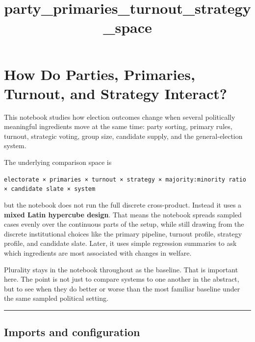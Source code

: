 \documentclass[11pt]{article}
\title{party\_primaries\_turnout\_strategy\_space}
\begin{document}
    
    \maketitle
    
    

    
    \section{How Do Parties, Primaries, Turnout, and Strategy
Interact?}\label{how-do-parties-primaries-turnout-and-strategy-interact}

This notebook studies how election outcomes change when several
politically meaningful ingredients move at the same time: party sorting,
primary rules, turnout, strategic voting, group size, candidate supply,
and the general-election system.

The underlying comparison space is

\texttt{electorate\ ×\ primaries\ ×\ turnout\ ×\ strategy\ ×\ majority:minority\ ratio\ ×\ candidate\ slate\ ×\ system}

but the notebook does not run the full discrete cross-product. Instead
it uses a \textbf{mixed Latin hypercube design}. That means the notebook
spreads sampled cases evenly over the continuous parts of the setup,
while still drawing from the discrete institutional choices like the
primary pipeline, turnout profile, strategy profile, and candidate
slate. Later, it uses simple regression summaries to ask which
ingredients are most associated with changes in welfare.

Plurality stays in the notebook throughout as the baseline. That is
important here. The point is not just to compare systems to one another
in the abstract, but to see when they do better or worse than the most
familiar baseline under the same sampled political setting.

    \begin{center}\rule{0.5\linewidth}{0.5pt}\end{center}

\subsection{Imports and configuration}\label{imports-and-configuration}
\end{document}
